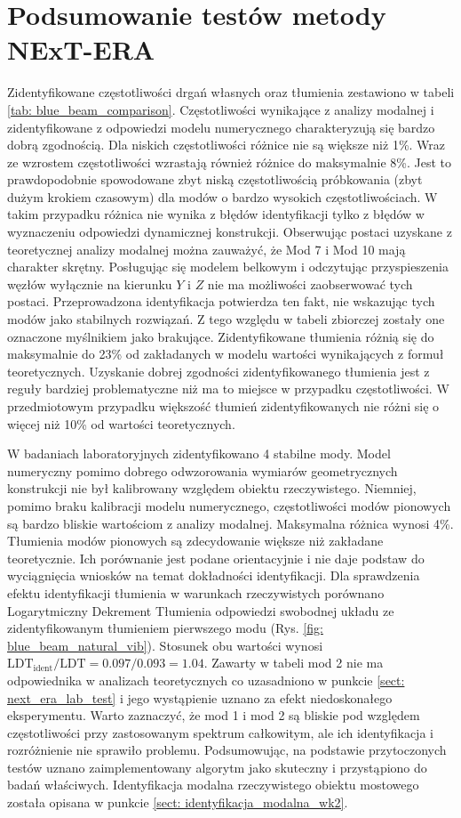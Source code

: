 \section{Podsumowanie testów metody NExT-ERA}
Zidentyfikowane częstotliwości drgań własnych oraz tłumienia zestawiono w tabeli \ref{tab: blue_beam_comparison}. 
Częstotliwości wynikające z analizy modalnej i zidentyfikowane z odpowiedzi modelu numerycznego charakteryzują się bardzo dobrą zgodnością. Dla niskich częstotliwości różnice nie są większe niż 1\%. Wraz ze wzrostem częstotliwości wzrastają również różnice do maksymalnie 8\%. Jest to prawdopodobnie spowodowane zbyt niską częstotliwością próbkowania (zbyt dużym krokiem czasowym) dla modów o bardzo wysokich częstotliwościach. W takim przypadku różnica nie wynika z błędów identyfikacji tylko z błędów w wyznaczeniu odpowiedzi dynamicznej konstrukcji. Obserwując postaci uzyskane z teoretycznej analizy modalnej można zauważyć, że Mod 7 i Mod 10 mają charakter skrętny. Posługując się modelem belkowym i odczytując przyspieszenia węzłów wyłącznie na kierunku $Y$ i $Z$ nie ma możliwości zaobserwować tych postaci. Przeprowadzona identyfikacja potwierdza ten fakt, nie wskazując tych modów jako stabilnych rozwiązań. Z tego względu w tabeli zbiorczej zostały one oznaczone myślnikiem jako brakujące. Zidentyfikowane tłumienia różnią się do maksymalnie do 23\% od zakładanych w modelu wartości wynikających z formuł teoretycznych. Uzyskanie dobrej zgodności zidentyfikowanego tłumienia jest z reguły bardziej problematyczne niż ma to miejsce w przypadku częstotliwości. W przedmiotowym przypadku większość tłumień zidentyfikowanych nie różni się o więcej niż 10\% od wartości teoretycznych.

W badaniach laboratoryjnych zidentyfikowano 4 stabilne mody. Model numeryczny pomimo dobrego odwzorowania wymiarów geometrycznych konstrukcji nie był kalibrowany względem obiektu rzeczywistego. Niemniej, pomimo braku kalibracji modelu numerycznego, częstotliwości modów pionowych są bardzo bliskie wartościom z analizy modalnej. Maksymalna różnica wynosi 4\%. Tłumienia modów pionowych są zdecydowanie większe niż zakładane teoretycznie. Ich porównanie jest podane orientacyjnie i nie daje podstaw do wyciągnięcia wniosków na temat dokładności identyfikacji. Dla sprawdzenia efektu identyfikacji tłumienia w warunkach rzeczywistych porównano Logarytmiczny Dekrement Tłumienia odpowiedzi swobodnej układu ze zidentyfikowanym tłumieniem pierwszego modu (Rys. \ref{fig: blue_beam_natural_vib}). Stosunek obu wartości wynosi $\text{LDT}_{\text{ident}}/\text{LDT} = 0.097/0.093=1.04$. Zawarty w tabeli mod 2 nie ma odpowiednika w analizach teoretycznych co uzasadniono w punkcie \ref{sect: next_era_lab_test} i jego wystąpienie uznano za efekt niedoskonałego eksperymentu. Warto zaznaczyć, że mod 1 i mod 2 są bliskie pod względem częstotliwości przy zastosowanym spektrum całkowitym, ale ich identyfikacja i rozróżnienie nie sprawiło problemu.
Podsumowując, na podstawie przytoczonych testów uznano zaimplementowany algorytm jako skuteczny i przystąpiono do badań właściwych. Identyfikacja modalna rzeczywistego obiektu mostowego została opisana w punkcie \ref{sect: identyfikacja_modalna_wk2}.

